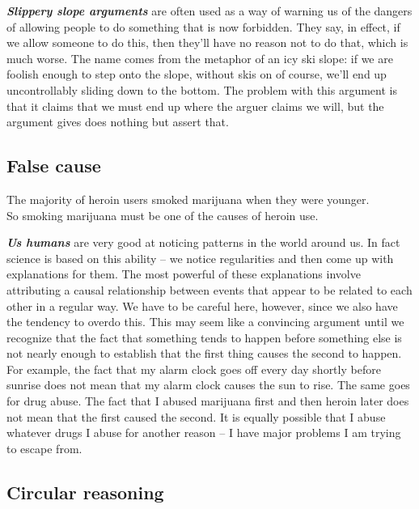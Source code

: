 \documentclass[
  12pt, openany]{book}
\theoremstyle{definition}
\theoremstyle{definition}
\theoremstyle{definition}
\theoremstyle{definition}
\theoremstyle{remark}
\begin{document}
\textbf{\emph{Slippery slope arguments}} are often used as a way of warning us of the dangers of allowing people to do something that is now forbidden. They say, in effect, if we allow someone to do this, then they'll have no reason not to do that, which is much worse. The name comes from the metaphor of an icy ski slope: if we are foolish enough to step onto the slope, without skis on of course, we'll end up uncontrollably sliding down to the bottom. The problem with this argument is that it claims that we must end up where the arguer claims we will, but the argument gives does nothing but assert that.

\hypertarget{false-cause}{%
\subsection*{False cause}\label{false-cause}}


\begin{center}

\begin{argument}
The majority of heroin users smoked marijuana when they were younger.\\
So smoking marijuana must be one of the causes of heroin use.

\end{argument}


\end{center}

\textbf{\emph{Us humans}} are very good at noticing patterns in the world around us. In fact science is based on this ability -- we notice regularities and then come up with explanations for them. The most powerful of these explanations involve attributing a causal relationship between events that appear to be related to each other in a regular way. We have to be careful here, however, since we also have the tendency to overdo this. This may seem like a convincing argument until we recognize that the fact that something tends to happen before something else is not nearly enough to establish that the first thing causes the second to happen. For example, the fact that my alarm clock goes off every day shortly before sunrise does not mean that my alarm clock causes the sun to rise. The same goes for drug abuse. The fact that I abused marijuana first and then heroin later does not mean that the first caused the second. It is equally possible that I abuse whatever drugs I abuse for another reason -- I have major problems I am trying to escape from.

\hypertarget{circular-reasoning}{%
\subsection*{Circular reasoning}\label{circular-reasoning}}
\end{document}
